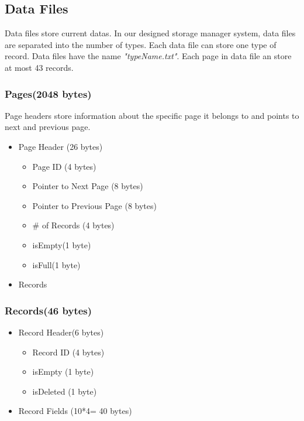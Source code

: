 \documentclass{article}
\newcounter{points}
\begin{document}
    \subsection{Data Files}
        Data files store current datas. In our designed storage manager system, data files are separated into the number of types. Each data file can store one type of record. Data files have the name \emph{"typeName.txt"}. Each page in data file an store at most 43 records.
        \subsubsection{Pages(2048 bytes)}
            Page headers store information about the specific page it belongs to and points to next and previous page.
            \begin{itemize}
              \item Page Header (26 bytes)
                \begin{itemize}
                     \item Page ID (4 bytes)
                     \item Pointer to Next Page (8 bytes)
                     \item Pointer to Previous Page (8 bytes)
                     \item \# of Records (4 bytes)
                     \item isEmpty(1 byte)
                     \item isFull(1 byte)
                \end{itemize}
              \item Records 
            \end{itemize}
        \subsubsection{Records(46 bytes)}
            \begin{itemize}
              \item Record Header(6 bytes)
                \begin{itemize}
                     \item Record ID (4 bytes)
                    \item isEmpty (1 byte)
                    \item isDeleted (1 byte)
                \end{itemize}
              \item Record Fields (10*4= 40 bytes)
            \end{itemize}
\end{document}
